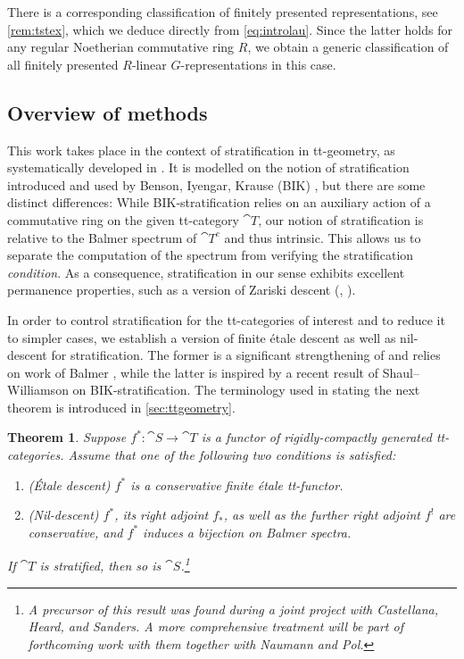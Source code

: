 \documentclass{amsart}%
\numberwithin{equation}{section}%
\newtheorem{thmx}{Theorem}
\theoremstyle{remark}
\newcounter{enum-resume-hack}
\begin{document}
There is a corresponding classification of finitely presented representations, see \cref{rem:tstex}, which we deduce directly from \eqref{eq:introlau}. Since the latter holds for any regular Noetherian commutative ring $R$, we obtain a generic classification of all finitely presented $R$-linear $G$-representations in this case.


\subsection{Overview of methods}

This work takes place in the context of stratification in tt-geometry, as systematically developed in \cite{bhs1}. It is modelled on the notion of stratification introduced and used by Benson, Iyengar, Krause (BIK) \cite{BensonIyengarKrause11a,BensonIyengarKrause11b}, but there are some distinct differences: While BIK-stratification relies on an auxiliary action of a commutative ring on the given tt-category $\cat T$, our notion of stratification is relative to the Balmer spectrum of $\cat T^c$ and thus intrinsic. This allows us to separate the computation of the spectrum from verifying the stratification \emph{condition}. As a consequence, stratification in our sense exhibits excellent permanence properties, such as a version of Zariski descent (\cite[Thm.~8.11]{Stevenson13}, \cite[Cor.~5.5]{bhs1}). 

In order to control stratification for the tt-categories of interest and to reduce it to simpler cases, we establish a version of finite \'etale descent as well as nil-descent for stratification. The former is a significant strengthening of \cite[Thm.~6.4]{bhs1} and relies on work of Balmer \cite{Balmer16b}, while the latter is inspired by a recent result of Shaul--Williamson \cite{sw_descent} on BIK-stratification. The terminology used in stating the next theorem is introduced in \cref{sec:ttgeometry}.

\begin{thmx}\label{thm:d}
Suppose $f^*\colon \cat S \to \cat T$ is a functor of rigidly-compactly generated tt-categories. Assume that one of the following two conditions is satisfied:
    \begin{enumerate}
        \item (\'Etale descent) $f^*$ is a conservative finite \'etale tt-functor.
        \item (Nil-descent) $f^*$, its right adjoint $f_*$, as well as the further right adjoint $f^!$ are conservative, and $f^*$ induces a bijection on Balmer spectra.
    \end{enumerate}
If $\cat T$ is stratified, then so is $\cat S$.\footnote{A precursor of this result was found during a joint project with Castellana, Heard, and Sanders. A more comprehensive treatment will be part of forthcoming work with them together with Naumann and Pol.}
\end{thmx}
\end{document}
